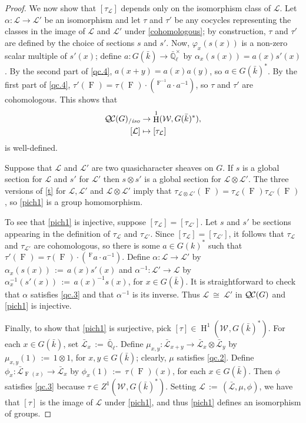 \documentclass[11pt]{amsart}
\theoremstyle{plain}
\theoremstyle{definition}
\theoremstyle{remark}
\newcommand{\EE}{\mathbb{\bar Q}_\ell}
\newcommand{\bFq}{\bar{k}}
\newcommand{\Fq}{k}
\newcommand{\EEx}{\EE^\times}
\newcommand{\Frob}[1]{\operatorname{F}_{#1}}
\DeclareMathOperator{\Hh}{H}
\newcommand{\ceq}{{\, :=\, }}
\newcommand{\iso}{{\ \cong\ }}
\newcommand{\qcs}[1]{{\mathcal{#1}}}
\newcommand{\gqcs}[1]{{\mathcal{\bar #1}}}
\newcommand{\QC}{{\mathcal{Q\hskip-0.8pt C}}}
\newcommand{\QCiso}[1]{\QC(#1)_{/\textit{iso}}}
\newcommand{\Weil}[1]{\mathcal{W}_{#1}}
\newcommand\Clifton[1]{\marginpar{\smaller\smaller CC: #1}}
\begin{document}
\begin{proof}
  We now show that $[\tau_\qcs{L}]$ depends only on the isomorphism class of $\qcs{L}$.
  Let $\alpha : \qcs{L} \to \qcs{L'}$ be an isomorphism and
  let $\tau$ and $\tau'$ be any cocycles representing the classes in the
  image of $\qcs{L}$ and $\qcs{L'}$ under \eqref{cohomologous}; by construction,
  $\tau$ and $\tau'$ are defined by the choice of sections $s$ and $s'$.
  Now, $\varphi_x(s(x))$ is a
  non-zero scalar multiple of $s'(x)$; define $a: G(\bFq) \to \EEx$
  by $\alpha_x(s(x)) = a(x) s'(x)$.
  By the second part of \ref{qc.4},
  $a(x+y) = a(x)a(y)$, so $a \in G(\bFq)^*$. By the first part of
  \ref{qc.4}, 
  $\tau'(\Frob{}) = \tau(\Frob{}) \cdot (\,^{\Frob{}^{-1}}a \cdot a^{-1})$,
  so $\tau$ and $\tau'$ are cohomologous. This shows that
  \begin{equation}\label{pich1}
  \begin{split}
    \QCiso{G} &\to \Hh^1(\Weil{},G(\bFq)^*),\\
    [\qcs{L}] &\mapsto [\tau_\qcs{L}]
  \end{split}
  \end{equation}
  is well-defined.
  
    Suppose that $\qcs{L}$ and $\qcs{L}'$ are two quasicharacter sheaves on $G$.
  If $s$ is a global section for $\qcs{L}$ and $s'$ for $\qcs{L}'$ then $s \otimes s'$
  is a global section for $\qcs{L} \otimes\qcs{L}'$.  The three versions of \eqref{t}
  for $\qcs{L}, \qcs{L'}$ and $\qcs{L} \otimes\qcs{L}'$ imply that
  $\tau_{\qcs{L} \otimes\qcs{L}'}(\Frob{}) = \tau_\qcs{L}(\Frob{}) \tau_{\qcs{L}'}(\Frob{})$,
  so \eqref{pich1} is a group homomorphism.
 
 
 To see that \eqref{pich1} is injective,
 suppose $[\tau_\qcs{L}] = [\tau_\qcs{L'}]$.
 Let $s$ and $s'$ be sections appearing in the definition of $\tau_\qcs{L}$ and $\tau_\qcs{L'}$.
 Since $[\tau_\qcs{L}] = [\tau_\qcs{L'}]$, 
 it follows that $\tau_\qcs{L}$ and $\tau_{\qcs{L'}}$ are cohomologous, 
 so there is some $a\in G(\Fq)^*$ such that 
 $\tau'(\Frob{}) = \tau(\Frob{}) \cdot (\,^{\Frob{}}a \cdot a^{-1})$. 
 Define $\alpha : \qcs{L}\to \qcs{L'}$ by $\alpha_x(s(x)) \ceq a(x) s'(x)$ and $\alpha^{-1} : \qcs{L}'\to \qcs{L}$
 by $\alpha^{-1}_x(s'(x)) \ceq a(x)^{-1} s(x)$, for $x\in G(\bFq)$.
 It is straightforward to check that $\alpha$ satisfies \ref{qc.3}
 and that $\alpha^{-1}$ is its inverse. Thus $\qcs{L} \iso \qcs{L'}$ in $\QC(G)$ and \eqref{pich1} is injective.
  

 Finally, to show that \eqref{pich1} is surjective, pick $[\tau]\in \Hh^1(\Weil{}, G(\bFq)^*)$.
 For each $x\in G(\bFq)$, set $\gqcs{L}_x \ceq \EE$.
 Define $\mu_{x,y} : \gqcs{L}_{x+y} \to \gqcs{L}_x\otimes \gqcs{L}_y$ by
 $\mu_{x,y}(1) \ceq 1\otimes1$, for $x,y\in G(\bFq)$; 
 clearly, $\mu$ satisfies \ref{qc.2}.
 Define $\phi_x : \gqcs{L}_{\Frob{}(x)} \to \gqcs{L}_x$ by $\phi_x(1) \ceq \tau(\Frob{})(x)$,
 for each $x\in G(\bFq)$. 
 Then $\phi$ satisfies \ref{qc.3} because $\tau \in Z^1(\Weil{},G(\bFq)^*)$.
 Setting $\qcs{L} \ceq (\gqcs{L},\mu,\phi)$, we have that $[\tau]$ is the image of $\qcs{L}$
 under \eqref{pich1}, and thus \eqref{pich1} defines an isomorphism of groups.
\end{proof}
\end{document}
